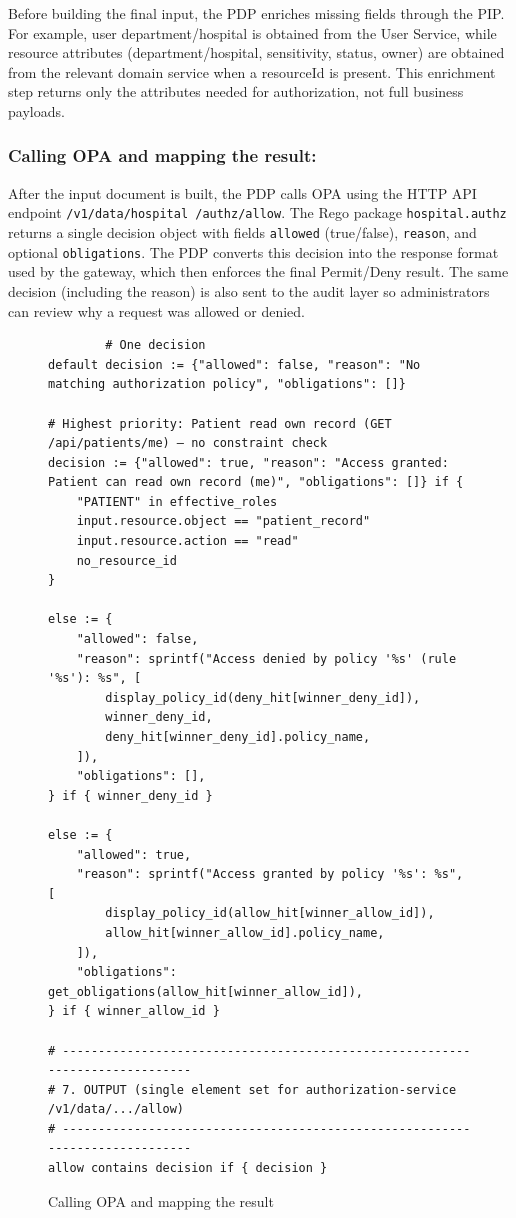 Before building the final input, the PDP enriches missing fields through the PIP. For example, user
department/hospital is obtained from the User Service, while resource attributes (department/hospital,
sensitivity, status, owner) are obtained from the relevant domain service when a resourceId is present.
This enrichment step returns only the attributes needed for authorization, not full business payloads.

\subsubsection{Calling OPA and mapping the result:}
After the input document is built, the PDP calls OPA using the HTTP API endpoint
\texttt{/v1/data/hospital /authz/allow}. The Rego package \texttt{hospital.authz} returns a single
decision object with fields \texttt{allowed} (true/false), \texttt{reason}, and optional \texttt{obligations}.
The PDP converts this decision into the response format used by the gateway, which then enforces the
final Permit/Deny result. The same decision (including the reason) is also sent to the audit layer so
administrators can review why a request was allowed or denied.
\vspace{0.5cm}



\begin{figure}[H]
    \begin{lstlisting}
        # One decision
default decision := {"allowed": false, "reason": "No matching authorization policy", "obligations": []}

# Highest priority: Patient read own record (GET /api/patients/me) — no constraint check
decision := {"allowed": true, "reason": "Access granted: Patient can read own record (me)", "obligations": []} if {
    "PATIENT" in effective_roles
    input.resource.object == "patient_record"
    input.resource.action == "read"
    no_resource_id
}

else := {
    "allowed": false,
    "reason": sprintf("Access denied by policy '%s' (rule '%s'): %s", [
        display_policy_id(deny_hit[winner_deny_id]),
        winner_deny_id,
        deny_hit[winner_deny_id].policy_name,
    ]),
    "obligations": [],
} if { winner_deny_id }

else := {
    "allowed": true,
    "reason": sprintf("Access granted by policy '%s': %s", [
        display_policy_id(allow_hit[winner_allow_id]),
        allow_hit[winner_allow_id].policy_name,
    ]),
    "obligations": get_obligations(allow_hit[winner_allow_id]),
} if { winner_allow_id }

# -----------------------------------------------------------------------------
# 7. OUTPUT (single element set for authorization-service /v1/data/.../allow)
# -----------------------------------------------------------------------------
allow contains decision if { decision }
    \end{lstlisting}
    \caption{Calling OPA and mapping the result}
    \label{fig:opa-decision-output}
\end{figure}



